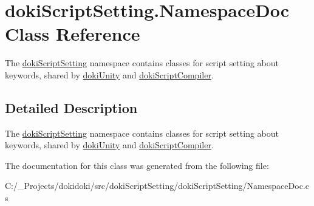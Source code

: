 \hypertarget{classdoki_script_setting_1_1_namespace_doc}{}\section{doki\+Script\+Setting.\+Namespace\+Doc Class Reference}
\label{classdoki_script_setting_1_1_namespace_doc}


The \hyperlink{namespacedoki_script_setting}{doki\+Script\+Setting} namespace contains classes for script setting about keywords, shared by \hyperlink{namespacedoki_unity}{doki\+Unity} and \hyperlink{namespacedoki_script_compiler}{doki\+Script\+Compiler}.  




\subsection{Detailed Description}
The \hyperlink{namespacedoki_script_setting}{doki\+Script\+Setting} namespace contains classes for script setting about keywords, shared by \hyperlink{namespacedoki_unity}{doki\+Unity} and \hyperlink{namespacedoki_script_compiler}{doki\+Script\+Compiler}. 



The documentation for this class was generated from the following file\+:\begin{DoxyCompactItemize}
\item 
C\+:/\+\_\+\+Projects/dokidoki/src/doki\+Script\+Setting/doki\+Script\+Setting/Namespace\+Doc.\+cs\end{DoxyCompactItemize}
